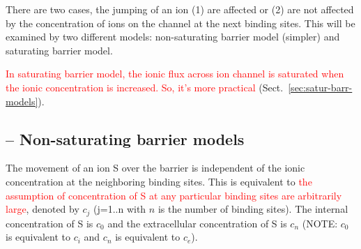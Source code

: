 There are two cases, the jumping of an ion (1) are affected or (2) are
not affected by the concentration of ions on the channel at the next
binding sites. This will be examined by two different models:
non-saturating barrier model (simpler) and saturating barrier model.

\textcolor{red}{In saturating barrier model, the ionic flux across ion
  channel is saturated when the ionic concentration is increased. So,
  it's more practical} (Sect.~\ref{sec:satur-barr-models}).

\subsection{-- Non-saturating barrier models}
\label{sec:non-satur-barr}

The movement of an ion S over the barrier is independent of the ionic
concentration at the neighboring binding sites. This is equivalent to
\textcolor{red}{the assumption of concentration of S at any particular
  binding sites are arbitrarily large},
denoted by $c_j$ (j=1..n with $n$ is the number of binding sites).
The internal concentration of S is $c_0$ and the extracellular
concentration of S is $c_n$ (NOTE: $c_0$ is equivalent to $c_i$ and
$c_n$ is equivalent to $c_e$).

